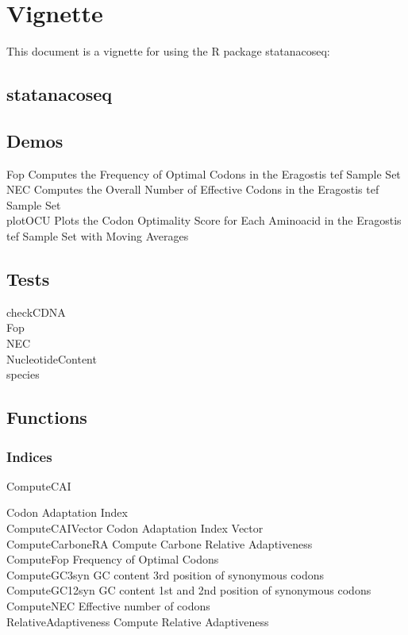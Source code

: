 \chapter{Vignette}
This document is a vignette for using the R package statanacoseq:


\section{statanacoseq}


\section{Demos}
Fop \quad Computes the Frequency of Optimal Codons in the Eragostis tef Sample Set \\
NEC \quad Computes the Overall Number of Effective Codons in the Eragostis tef Sample Set \\
plotOCU \quad Plots the Codon Optimality Score for Each Aminoacid in the Eragostis tef Sample Set with Moving Averages \\


\section{Tests}
checkCDNA \quad \\
Fop \quad \\
NEC \quad \\
NucleotideContent \quad \\
species \quad \\

\section{Functions}

\subsection{Indices}
\hypertarget{function:CAI}{ComputeCAI}	\quad Codon Adaptation Index \\
\hypertarget{function:CAIv}{ComputeCAIVector} \quad 	Codon Adaptation Index Vector \\
\hypertarget{function:RA}{ComputeCarboneRA}	\quad Compute Carbone Relative Adaptiveness \\
\hypertarget{function:Fop}{ComputeFop}	\quad Frequency of Optimal Codons \\
\hypertarget{function:G3C}{ComputeGC3syn}	\quad GC content 3rd position of synonymous codons	 \\	
\hypertarget{function:G12C}{ComputeGC12syn}	\quad GC content 1st and 2nd position of synonymous codons	 \\	
\hypertarget{function:NEC}{ComputeNEC}	\quad Effective number of codons \\							%
\hypertarget{function:RA}{RelativeAdaptiveness}	\quad Compute Relative Adaptiveness	 \\			%

